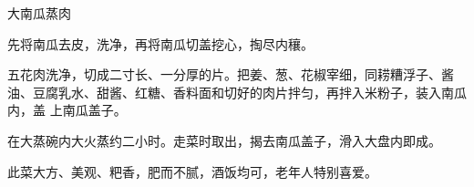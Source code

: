 \begin{recipe}[一品南瓜蒸肉]{大南瓜蒸肉}

\ingredients


\preparation

\step 先将南瓜去皮，洗净，再将南瓜切盖挖心，掏尽内穰。

\step 五花肉洗净，切成二寸长、一分厚的片。把姜、葱、花椒宰细，同耢糟浮子、酱
油、豆腐乳水、甜酱、红糖、香料面和切好的肉片拌匀，再拌入米粉子，装入南瓜内，盖
上南瓜盖子。

\step 在大蒸碗内大火蒸约二小时。走菜时取出，揭去南瓜盖子，滑入大盘内即成。

\features

此菜大方、美观、粑香，肥而不腻，酒饭均可，老年人特别喜爱。

\end{recipe}

